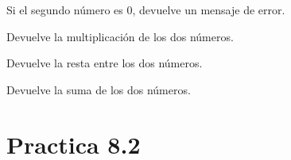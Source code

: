 \documentclass[letterpaper,10pt,spanish]{sphinxmanual}
\begin{document}
\begin{fulllineitems}
\begin{fulllineitems}
\sphinxAtStartPar
Si el segundo número es 0, devuelve un mensaje de error.

\end{fulllineitems}


\begin{fulllineitems}
\label{\detokenize{pr8:pr8.1.Calculadora.multiplicar}}
\pysigstartsignatures
{}
\pysigstopsignatures
\sphinxAtStartPar
Devuelve la multiplicación de los dos números.

\end{fulllineitems}


\begin{fulllineitems}
\label{\detokenize{pr8:pr8.1.Calculadora.restar}}
\pysigstartsignatures
{}
\pysigstopsignatures
\sphinxAtStartPar
Devuelve la resta entre los dos números.

\end{fulllineitems}


\begin{fulllineitems}
\label{\detokenize{pr8:pr8.1.Calculadora.sumar}}
\pysigstartsignatures
{}
\pysigstopsignatures
\sphinxAtStartPar
Devuelve la suma de los dos números.

\end{fulllineitems}


\end{fulllineitems}



\section{Practica 8.2}
\label{\detokenize{pr8:module-pr8.2}}\label{\detokenize{pr8:practica-8-2}}
\end{document}
